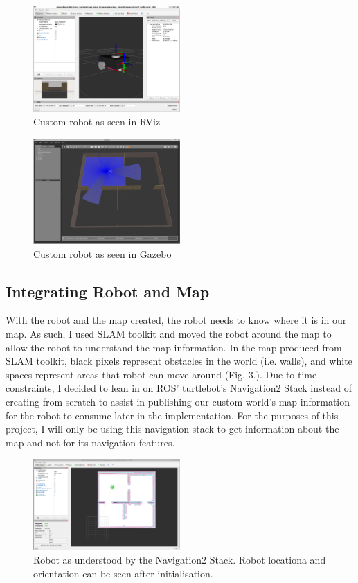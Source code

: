 \documentclass[conference]{IEEEtran}
\begin{document}
\begin{figure}[h]
  \centering
  \includegraphics[width=0.5\textwidth]{../assets/robot_rviz.png}
  \caption{Custom robot as seen in RViz}
  \label{fig:example}
\end{figure}
\begin{figure}[h]
  \centering
  \includegraphics[width=0.5\textwidth]{../assets/robot_gazebo.png}
  \caption{Custom robot as seen in Gazebo}
  \label{fig:example}
\end{figure}

\subsection{Integrating Robot and Map}
With the robot and the map created, the robot needs to know where it is in our map. As such, I used SLAM toolkit and moved the robot around the map to allow the robot to understand the map information. In the map produced from SLAM toolkit, black pixels represent obstacles in the world (i.e. walls), and white spaces represent areas that robot can move around (Fig. 3.).
Due to time constraints, I decided to lean in on ROS' turtlebot's Navigation2 Stack instead of creating from scratch to assist in publishing our custom world's map information for the robot to consume later in the implementation. For the purposes of this project, I will only be using this navigation stack to get information about the map and not for its navigation features.

\begin{figure}[h]
  \centering
  \includegraphics[width=0.5\textwidth]{../assets/map_nav_1.png}
  \caption{Robot as understood by the Navigation2 Stack. Robot locationa and orientation can be seen after initialisation.}
  \label{fig:example}
\end{figure}
\end{document}
